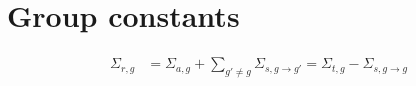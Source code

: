 \section{Group constants}
\label{appendix:group-const}


\begin{align}
\Sigma_{r,g} &= \Sigma_{a,g} + \sum_{g' \ne g} \Sigma_{s,g \rightarrow g'} = \Sigma_{t,g} - \Sigma_{s, g \rightarrow g}
\label{eq:removal}
\end{align}
